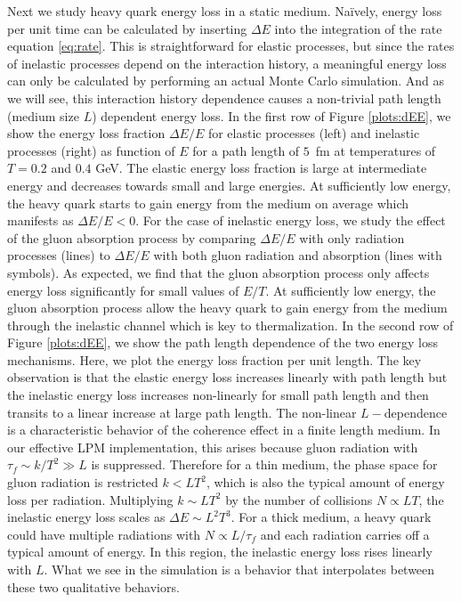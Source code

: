 Next we study heavy quark energy loss in a static medium.
Na\"ively, energy loss per unit time can be calculated by inserting $\Delta E$ into the integration of the rate equation \ref{eq:rate}. 
This is straightforward for elastic processes, but since the rates of inelastic processes depend on the interaction history, a meaningful energy loss can only be calculated by performing an actual Monte Carlo simulation.
And as we will see, this interaction history dependence causes a non-trivial path length (medium size $L$) dependent energy loss.
In the first row of Figure \ref{plots:dEE}, we show the energy loss fraction $\Delta E/E$ for elastic processes (left) and inelastic processes (right) as function of $E$ for a path length of $5$~fm at temperatures of $T=0.2$ and $0.4$  GeV.
The elastic energy loss fraction is large at intermediate energy and decreases towards small and large energies.
At sufficiently low energy, the heavy quark starts to gain energy from the medium on average which manifests as $\Delta E/E < 0$.
For the case of inelastic energy loss, we study the effect of the gluon absorption process by comparing $\Delta E/E$ with only radiation processes (lines) to $\Delta E/E$ with both gluon radiation and absorption (lines with symbols).
As expected, we find that the gluon absorption process only affects energy loss significantly for small values of $E/T$.
At sufficiently low energy, the gluon absorption process allow the heavy quark to gain energy from the medium through the inelastic channel which is key to thermalization.
In the second row of Figure \ref{plots:dEE}, we show the path length dependence of the two energy loss mechanisms.
Here, we plot the energy loss fraction per unit length.
The key observation is that the elastic energy loss increases linearly with path length but the inelastic energy loss increases non-linearly for small path length and then transits to a linear increase at large path length. 
The non-linear $L-$dependence is a characteristic behavior of the coherence effect in a finite length medium. 
In our effective LPM implementation, this arises because gluon radiation with $\tau_f \sim k/T^2 \gg L$ is suppressed.
Therefore for a thin medium, the phase space for gluon radiation is restricted $k < LT^2$, which is also the typical amount of energy loss per radiation.
Multiplying $k \sim LT^2$ by the number of collisions $N \propto LT$, the inelastic energy loss scales as $\Delta E \sim L^2T^3$.
For a thick medium, a heavy quark could have multiple radiations with $N \propto L/\tau_f$ and each radiation carries off a typical amount of energy. 
In this region, the inelastic energy loss rises linearly with $L$.
What we see in the simulation is a behavior that interpolates between these two qualitative behaviors.


